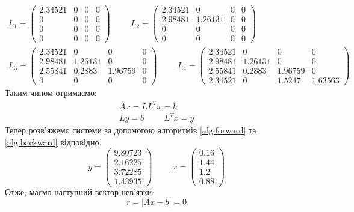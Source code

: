 \begin{gather*}
    L_1 = \begin{pmatrix}
        2.34521 & 0 & 0 & 0 \\
        0 & 0 & 0 & 0 \\
        0 & 0 & 0 & 0 \\
        0 & 0 & 0 & 0
    \end{pmatrix} \hspace{1cm}
    L_2 = \begin{pmatrix}
        2.34521 & 0 & 0 & 0 \\
        2.98481 & 1.26131 & 0 & 0 \\
        0 & 0 & 0 & 0 \\
        0 & 0 & 0 & 0
    \end{pmatrix} \\
    L_3 = \begin{pmatrix}
        2.34521 & 0 & 0 & 0 \\
        2.98481 & 1.26131 & 0 & 0 \\
        2.55841 & 0.2883 & 1.96759 & 0 \\
        0 & 0 & 0 & 0
    \end{pmatrix} \hspace{1cm}
    L_4 = \begin{pmatrix}
        2.34521 & 0 & 0 & 0 \\
        2.98481 & 1.26131 & 0 & 0 \\
        2.55841 & 0.2883 & 1.96759 & 0 \\
        2.34521 & 0 & 1.5247 & 1.63563
    \end{pmatrix}
\end{gather*}
Таким чином отримаємо:
\begin{gather*}
    Ax = LL^Tx= b \\
    Ly = b \hspace{1cm}
    L^T x = y
\end{gather*}
Тепер розв'яжемо системи за допомогою
алгоритмів \ref{alg:forward} та
\ref{alg:backward} відповідно.
\[
    y = \begin{pmatrix}
        9.80723 \\
        2.16225 \\
        3.72285 \\
        1.43935
    \end{pmatrix} \hspace{1cm}
    x = \begin{pmatrix}
        0.16 \\
        1.44 \\
        1.2 \\
        0.88
    \end{pmatrix}
\]
Отже, маємо наступний вектор нев'язки:
\[
    r=|Ax-b| = 0
\]

